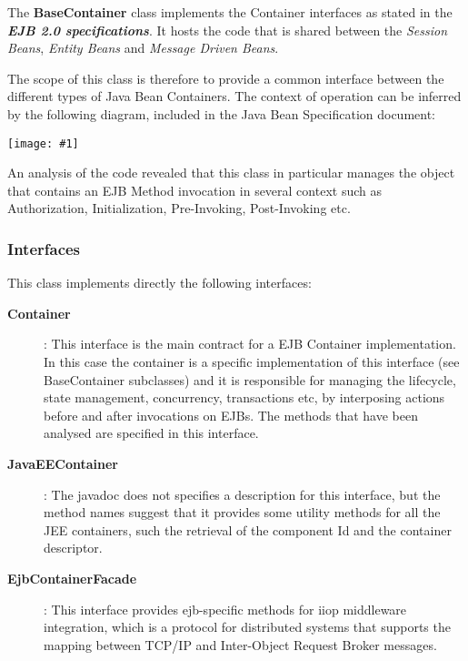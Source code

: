 \documentclass[11pt, a4paper,titlepage]{article}
\newcommand{\image}[1]{
	\begin{center}
		\noindent \texttt{[image: \#1]}
	\end{center}
	}
\begin{document}
	The \textbf{BaseContainer} class implements the Container interfaces as stated in the \textit{\textbf{EJB 2.0 specifications}}. It hosts the code that is shared between the \textit{Session Beans}, \textit{Entity Beans} and \textit{Message Driven Beans}. \newline
	
	The scope of this class is therefore to provide a common interface between the different types of Java Bean Containers. The context of operation can be inferred by the following diagram, included in the Java Bean Specification document:
	 \image{ejb_contract.png}
	 
	An analysis of the code revealed that this class in particular manages the object that contains an EJB Method invocation in several context such as Authorization, Initialization, Pre-Invoking, Post-Invoking etc.
	\subsubsection{Interfaces}
	This class implements directly the following interfaces:
	 \begin{description}
	 	\item[\textbf{Container}]: This interface is the main contract for a EJB Container implementation. In this case the container is a specific implementation of this interface (see BaseContainer subclasses) and it is responsible for managing the lifecycle, state management, concurrency, transactions etc, by interposing actions before and after invocations on EJBs.
	 	 The methods that have been analysed are specified in this interface.
	 	 \item[\textbf{JavaEEContainer}]: The javadoc does not specifies a description for this interface, but the method names suggest that it provides some utility methods for all the JEE containers, such the retrieval of the component Id and the container descriptor.
	 	 \item[\textbf{EjbContainerFacade}]: This interface provides ejb-specific methods for iiop middleware integration, which is a protocol for distributed systems that supports the mapping between TCP/IP and Inter-Object Request Broker messages.
	 \end{description}
\end{document}
